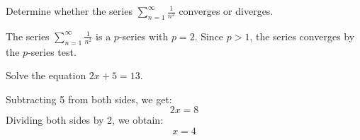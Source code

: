 \documentclass{article}
\begin{document}
        \begin{problem}
        Determine whether the series \( \sum_{n=1}^{\infty} \frac{1}{n^2} \) converges or diverges.
        \end{problem}

        \begin{solution}
        The series \( \sum_{n=1}^{\infty} \frac{1}{n^2} \) is a \( p \)-series with \( p = 2 \). Since \( p > 1 \), the series converges by the \( p \)-series test.
        \end{solution}

        \begin{problem}
        Solve the equation \( 2x + 5 = 13 \).
        \end{problem}

        \begin{solution}
        Subtracting 5 from both sides, we get:
        \[
        2x = 8
        \]
        Dividing both sides by 2, we obtain:
        \[
        x = 4
        \]
        \end{solution}
\end{document}
